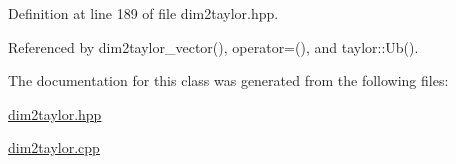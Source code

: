 \-Definition at line 189 of file dim2taylor.\-hpp.



\-Referenced by dim2taylor\-\_\-vector(), operator=(), and taylor\-::\-Ub().



\-The documentation for this class was generated from the following files\-:\begin{DoxyCompactItemize}
\item 
\hyperlink{dim2taylor_8hpp}{dim2taylor.\-hpp}\item 
\hyperlink{dim2taylor_8cpp}{dim2taylor.\-cpp}\end{DoxyCompactItemize}
